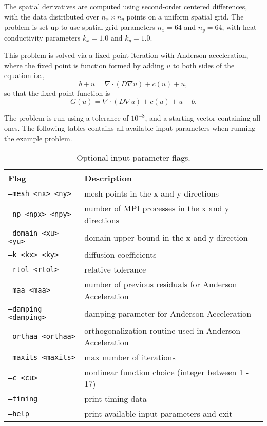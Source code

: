 The spatial derivatives are computed using second-order centered differences,
with the data distributed over $n_x\times n_y$ points on a uniform spatial grid.
The problem is set up to use spatial grid parameters $n_x=64$ and $n_y=64$, with
heat conductivity parameters $k_x=1.0$ and $k_y=1.0$.

This problem is solved via a fixed point iteration with Anderson acceleration,
where the fixed point is function formed by adding $u$ to both sides of the
equation i.e.,
\begin{equation}
  b + u = \nabla \cdot (D \nabla u) + c(u) + u,
\end{equation}
so that the fixed point function is
\begin{equation}
  G(u) = \nabla \cdot (D \nabla u) + c(u) + u - b.
\end{equation}

The problem is run using a tolerance of $10^{-8}$, and a starting vector
containing all ones. The following tables contains all available input
parameters when running the example problem.

\begin{center}
\begin{table}
\label{tab:input_params}
\caption{Optional input parameter flags.}
 \begin{tabular}{ |p{5cm}|p{10cm}| }
\hline
Flag & Description \\
\hline
{\tt --mesh <nx> <ny>} & mesh points in the x and y directions\\
{\tt --np <npx> <npy>} & number of MPI processes in the x and y directions\\
{\tt --domain <xu> <yu>} & domain upper bound in the x and y direction\\
{\tt --k <kx> <ky>} & diffusion coefficients\\
{\tt --rtol <rtol>} & relative tolerance\\
{\tt --maa <maa>} & number of previous residuals for Anderson Acceleration \\
{\tt --damping <damping>} & damping parameter for Anderson Acceleration \\
{\tt --orthaa <orthaa>} & orthogonalization routine used in Anderson Acceleration \\
{\tt --maxits <maxits>} & max number of iterations \\
{\tt --c <cu>} & nonlinear function choice (integer between 1 - 17)\\
{\tt --timing} & print timing data\\
{\tt --help} & print available input parameters and exit\\
\hline
\end{tabular}
\end{table}
\end{center}

